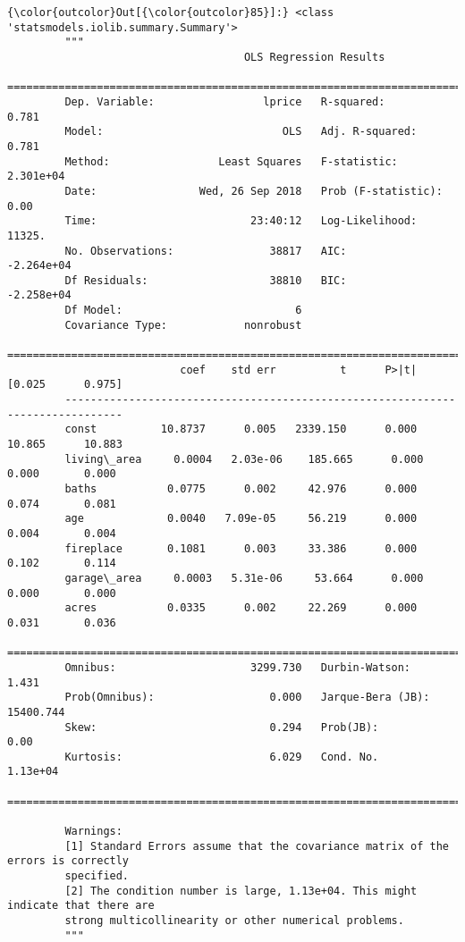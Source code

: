 \documentclass[11pt]{article}
\begin{document}
\begin{Verbatim}[commandchars=\\\{\}]
{\color{outcolor}Out[{\color{outcolor}85}]:} <class 'statsmodels.iolib.summary.Summary'>
         """
                                     OLS Regression Results                            
         ==============================================================================
         Dep. Variable:                 lprice   R-squared:                       0.781
         Model:                            OLS   Adj. R-squared:                  0.781
         Method:                 Least Squares   F-statistic:                 2.301e+04
         Date:                Wed, 26 Sep 2018   Prob (F-statistic):               0.00
         Time:                        23:40:12   Log-Likelihood:                 11325.
         No. Observations:               38817   AIC:                        -2.264e+04
         Df Residuals:                   38810   BIC:                        -2.258e+04
         Df Model:                           6                                         
         Covariance Type:            nonrobust                                         
         ===============================================================================
                           coef    std err          t      P>|t|      [0.025      0.975]
         -------------------------------------------------------------------------------
         const          10.8737      0.005   2339.150      0.000      10.865      10.883
         living\_area     0.0004   2.03e-06    185.665      0.000       0.000       0.000
         baths           0.0775      0.002     42.976      0.000       0.074       0.081
         age             0.0040   7.09e-05     56.219      0.000       0.004       0.004
         fireplace       0.1081      0.003     33.386      0.000       0.102       0.114
         garage\_area     0.0003   5.31e-06     53.664      0.000       0.000       0.000
         acres           0.0335      0.002     22.269      0.000       0.031       0.036
         ==============================================================================
         Omnibus:                     3299.730   Durbin-Watson:                   1.431
         Prob(Omnibus):                  0.000   Jarque-Bera (JB):            15400.744
         Skew:                           0.294   Prob(JB):                         0.00
         Kurtosis:                       6.029   Cond. No.                     1.13e+04
         ==============================================================================
         
         Warnings:
         [1] Standard Errors assume that the covariance matrix of the errors is correctly 
         specified.
         [2] The condition number is large, 1.13e+04. This might indicate that there are
         strong multicollinearity or other numerical problems.
         """
\end{Verbatim}
            
\end{document}

